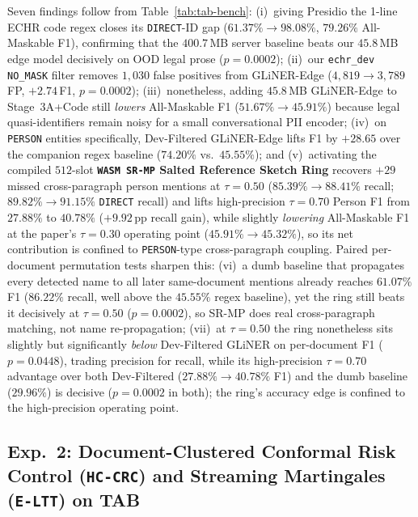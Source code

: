 \documentclass{article}
\begin{document}
Seven findings follow from Table~\ref{tab:tab-bench}: (i)~giving Presidio the 1-line ECHR code regex closes its \texttt{DIRECT}-ID gap ($61.37\% \to 98.08\%$, $79.26\%$ All-Maskable F1), confirming that the $400.7$\,MB server baseline beats our $45.8$\,MB edge model \citep{knowledgator2025glineredge} decisively on OOD legal prose ($p{=}0.0002$); (ii)~our \texttt{echr\_dev} \texttt{NO\_MASK} filter removes $1{,}030$ false positives from GLiNER-Edge ($4{,}819 \to 3{,}789$ FP, $+2.74$\,F1, $p{=}0.0002$); (iii)~nonetheless, adding $45.8$\,MB GLiNER-Edge to Stage~3A+Code still \emph{lowers} All-Maskable F1 ($51.67\% \to 45.91\%$) because legal quasi-identifiers remain noisy for a small conversational PII encoder; (iv)~on \texttt{PERSON} entities specifically, Dev-Filtered GLiNER-Edge lifts F1 by $+28.65$ over the companion regex baseline ($74.20\%$ vs.\ $45.55\%$); and (v)~activating the compiled $512$-slot \textbf{\texttt{WASM SR-MP} Salted Reference Sketch Ring} recovers $+29$ missed cross-paragraph person mentions at $\tau{=}0.50$ ($85.39\% \to 88.41\%$ recall; $89.82\% \to 91.15\%$ \texttt{DIRECT} recall) and lifts high-precision $\tau{=}0.70$ Person F1 from $27.88\%$ to $\mathbf{40.78\%}$ ($+9.92$\,pp recall gain), while slightly \emph{lowering} All-Maskable F1 at the paper's $\tau{=}0.30$ operating point ($45.91\% \to 45.32\%$), so its net contribution is confined to \texttt{PERSON}-type cross-paragraph coupling. Paired per-document permutation tests sharpen this: (vi)~a dumb baseline that propagates every detected name to all later same-document mentions already reaches $61.07\%$ F1 ($86.22\%$ recall, well above the $45.55\%$ regex baseline), yet the ring still beats it decisively at $\tau{=}0.50$ ($p{=}0.0002$), so SR-MP does real cross-paragraph matching, not name re-propagation; (vii)~at $\tau{=}0.50$ the ring nonetheless sits slightly but significantly \emph{below} Dev-Filtered GLiNER on per-document F1 ($p{=}0.0448$), trading precision for recall, while its high-precision $\tau{=}0.70$ advantage over both Dev-Filtered ($27.88\% \to 40.78\%$ F1) and the dumb baseline ($29.96\%$) is decisive ($p{=}0.0002$ in both); the ring's accuracy edge is confined to the high-precision operating point.

\subsection{Exp.~2: Document-Clustered Conformal Risk Control (\texttt{HC-CRC}) and Streaming Martingales (\texttt{E-LTT}) on TAB}
\label{sec:exp2}
\end{document}
